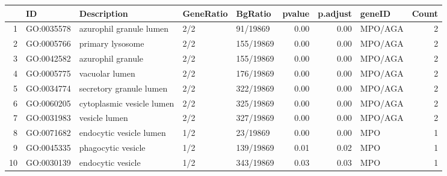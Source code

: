 \begin{table}[ht]
\centering
\begin{tabular}{rllllrrlr}
  \hline
 & ID & Description & GeneRatio & BgRatio & pvalue & p.adjust & geneID & Count \\ 
  \hline
1 & GO:0035578 & azurophil granule lumen & 2/2 & 91/19869 & 0.00 & 0.00 & MPO/AGA &   2 \\ 
  2 & GO:0005766 & primary lysosome & 2/2 & 155/19869 & 0.00 & 0.00 & MPO/AGA &   2 \\ 
  3 & GO:0042582 & azurophil granule & 2/2 & 155/19869 & 0.00 & 0.00 & MPO/AGA &   2 \\ 
  4 & GO:0005775 & vacuolar lumen & 2/2 & 176/19869 & 0.00 & 0.00 & MPO/AGA &   2 \\ 
  5 & GO:0034774 & secretory granule lumen & 2/2 & 322/19869 & 0.00 & 0.00 & MPO/AGA &   2 \\ 
  6 & GO:0060205 & cytoplasmic vesicle lumen & 2/2 & 325/19869 & 0.00 & 0.00 & MPO/AGA &   2 \\ 
  7 & GO:0031983 & vesicle lumen & 2/2 & 327/19869 & 0.00 & 0.00 & MPO/AGA &   2 \\ 
  8 & GO:0071682 & endocytic vesicle lumen & 1/2 & 23/19869 & 0.00 & 0.00 & MPO &   1 \\ 
  9 & GO:0045335 & phagocytic vesicle & 1/2 & 139/19869 & 0.01 & 0.02 & MPO &   1 \\ 
  10 & GO:0030139 & endocytic vesicle & 1/2 & 343/19869 & 0.03 & 0.03 & MPO &   1 \\ 
   \hline
\end{tabular}
\end{table}



\hfill
